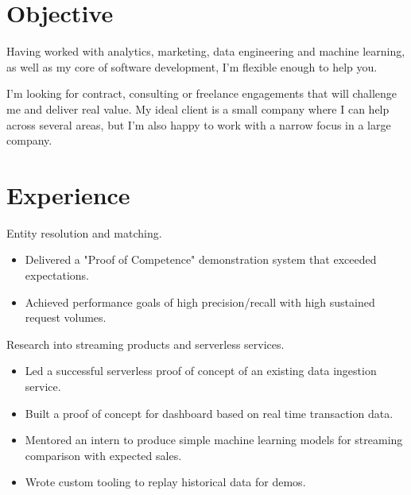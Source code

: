 \documentclass[11pt,a4paper,sans]{moderncv}        %
\begin{document}
\makecvtitle

\section{Objective}
Having worked with analytics, marketing, data engineering and machine learning, as well as my core of software development, I'm flexible enough to help you.

I'm looking for contract, consulting or freelance engagements that will challenge me
and deliver real value.
My ideal client is a small company where I can help across several areas,
but I'm also happy to work with a narrow focus in a large company.

\section{Experience}
{Entity resolution and matching.
\newline{}
\begin{itemize}
\item Delivered a "Proof of Competence" demonstration system that exceeded expectations.
\item Achieved performance goals of high precision/recall with high sustained request volumes.
\end{itemize}
}

{Research into streaming products and serverless services.
\newline{}
\begin{itemize}
\item Led a successful serverless proof of concept of an existing data ingestion service.
\item Built a proof of concept for dashboard based on real time transaction data.
\item Mentored an intern to produce simple machine learning models for streaming comparison with expected sales.
\item Wrote custom tooling to replay historical data for demos.
\end{itemize}
}
\end{document}
